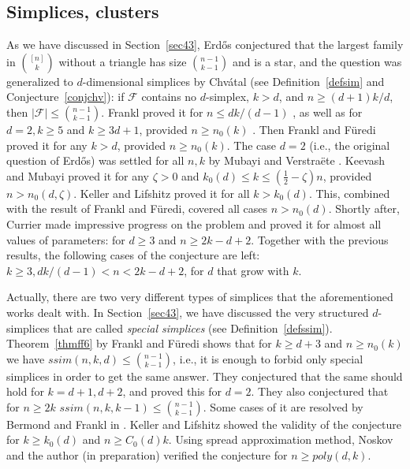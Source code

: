 \documentclass[graybox]{svmult}
\renewcommand{\le}{\leqslant}
\renewcommand{\ge}{\geqslant}
\newcommand{\ff}{\mathcal{F}}
\begin{document}
\subsection{Simplices, clusters}
As we have discussed in Section~\ref{sec43}, Erd\H os \cite{E4} conjectured that the largest family in ${[n]\choose k}$ without a triangle has size ${n-1\choose k-1}$ and is a star, and the question was generalized to $d$-dimensional simplices by Chv\'atal \cite{Chv} (see Definition~\ref{defsim} and Conjecture~\ref{conjchv}): if $\ff$ contains no $d$-simplex, $k>d$, and $n\ge (d+1)k/d$, then $|\ff|\le {n-1\choose k-1}$. Frankl proved it for $n\le dk/(d-1)$ \cite{Fra76}, as well as for $d=2,k\ge 5$ and $k\ge 3d+1$, provided $n\ge n_0(k)$ \cite{Fra81}. Then Frankl and F\"uredi proved it for any $k>d$, provided $n\ge n_0(k)$. The case $d=2$ (i.e., the original question of Erd\H os) was settled for all $n,k$ by Mubayi and Verstra\"ete \cite{MV}. Keevash and Mubayi \cite{KM} proved it for any $\zeta>0$ and $k_0(d)\le k\le (\frac 12-\zeta)n$, provided $n>n_0(d,\zeta).$ Keller and Lifshitz \cite{KL} proved it for all $k>k_0(d)$. This, combined with the result of Frankl and F\"uredi, covered all cases $n>n_0(d)$. Shortly after, Currier \cite{Curr2} made impressive progress on the problem and proved it for almost all values of parameters: for $d\ge 3$ and $n\ge 2k-d+2$. Together with the previous results, the following cases of the conjecture are left:  $k\ge 3, dk/(d-1)<n< 2k-d+2$, for $d$ that grow with $k$.

 Actually, there are two very different types of simplices that the aforementioned works dealt with. In Section~\ref{sec43}, we have discussed the very structured $d$-simplices that are called {\it special simplices} (see Definition~\ref{defssim}). Theorem~\ref{thmff6} by Frankl and F\"uredi \cite{FF2} shows that for $k\ge d+3$ and $n\ge n_0(k)$ we have $ssim(n,k,d)\le {n-1\choose k-1}$, i.e., it is enough to forbid only special simplices in order to get the same answer. They conjectured that the same should hold for $k=d+1,d+2$, and proved this for $d=2$. They also conjectured that for $n\ge 2k$ $ssim(n,k,k-1)\le {n-1\choose k-1}$. Some cases of it are resolved by Bermond and Frankl in \cite{BF}. Keller and Lifshitz \cite{KL} showed the validity of the conjecture for $k\ge k_0(d)$ and $n\ge C_0(d) k$. Using spread approximation method, Noskov and the author (in preparation) verified the conjecture for $n\ge poly(d,k)$.
\end{document}
